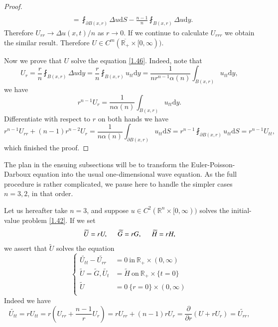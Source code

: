 \begin{proof}
$$\begin{aligned}
\\
&=\fint_{\partial B\left( x,r \right)}{\Delta u\mathrm{d}S}-\frac{n-1}{n}\fint_{B\left( x,r \right)}{\Delta u\mathrm{d}y}.
\end{aligned}
$$
Therefore $U_{rr}\to \Delta u(x,t)/n$ as $r\to 0$. If we continue to calculate $U_{rrr}$ we obtain the similar result. Therefore $U\in C^m(\overline{\mathbb{R}_+}\times[0,\infty))$.\par
Now we prove that $U$ solve the equation \eqref{1.46}. Indeed, note that 
$$
U_r=\frac{r}{n}\fint_{B\left( x,r \right)}{\Delta u\mathrm{d}y}=\frac{r}{n}\fint_{B\left( x,r \right)}{u_{tt}\mathrm{d}y}=\frac{1}{nr^{n-1}\alpha \left( n \right)}\int_{B\left( x,r \right)}{u_{tt}\mathrm{d}y},
$$
we have 
$$
r^{n-1}U_r=\frac{1}{n\alpha \left( n \right)}\int_{B\left( x,r \right)}{u_{tt}\mathrm{d}y}.
$$
Differentiate with respect to $r$ on both hands we have 
$$
r^{n-1}U_{rr}+\left( n-1 \right) r^{n-2}U_r=\frac{1}{n\alpha \left( n \right)}\int_{\partial B\left( x,r \right)}{u_{tt}\mathrm{d}S}=r^{n-1}\fint_{\partial B\left( x,r \right)}{u_{tt}\mathrm{d}S}=r^{n-1}U_{tt},
$$
which finished the proof.
\end{proof}
The plan in the ensuing subsections will be to transform the Euler-Poisson-Darboux equation into the usual one-dimensional wave equation. As the full procedure is rather complicated, we pause here to handle the simpler cases $n=3,2$, in that order.\par
Let us hereafter take $n=3$, and suppose $u\in C^2(\mathbb{R}^n\times[0,\infty))$ solves the initial-value problem \eqref{1.42}. If we set 
$$
\widetilde{U}=rU,\hspace{0.5cm}\widetilde{G}=rG,\hspace{0.5cm}\widetilde{H}=rH,
$$
we assert that $\widetilde{U}$ solves the equation 
\begin{equation}\label{1.48}
\left\{ \begin{aligned}
	\widetilde{U_{tt}}-\widetilde{U_{rr}}&=0\ \text{in}\ \mathbb{R}_+\times(0,\infty)\\
	\widetilde{U}=\widetilde{G},\widetilde{U_t}&=\widetilde{H}\ \text{on}\ \mathbb{R}_+\times\{t=0\}\\
	\widetilde{U}&=0\ \{r=0\}\times(0,\infty)\\
\end{aligned} \right. 
\end{equation}
Indeed we have 
$$
\widetilde{U_{tt}}=rU_{tt}=r\left( U_{rr}+\frac{n-1}{r}U_r \right) =rU_{rr}+\left( n-1 \right) rU_r=\frac{\partial}{\partial r}\left( U+rU_r \right) =\widetilde{U_{rr}},
$$
